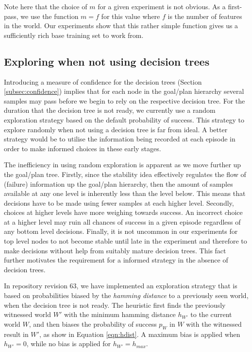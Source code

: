 \documentclass[a4paper]{article}
\newcommand{\dt}{{decision tree}\xspace}
\begin{document}
Note here that the choice of $m$ for a given experiment is not obvious. As a first-pass, we use the function $m=f$ for this value where $f$ is the number of features in the world. Our experiments show that this rather simple function gives us a sufficiently rich base training set to work from. 

\subsection{Exploring when not using {\dt}s}

Introducing a measure of confidence for the {\dt}s (Section \ref{subsec:confidence}) implies that for each node in the goal/plan hierarchy several samples may pass before we begin to rely on the respective \dt. For the duration that the \dt is not ready, we currently use a random exploration strategy based on the default probability of success. This strategy to explore randomly when not using a \dt is far from ideal. A better strategy would be to utilise the information being recorded at each episode in order to make informed choices in these early stages. 

The inefficiency in using random exploration is apparent as we move further up the goal/plan tree. Firstly, since the stability idea effectively regulates the flow of (failure) information up the goal/plan hierarchy, then the amount of samples available at any one level is inherently less than the level below. This means that decisions have to be made using fewer samples at each higher level. Secondly, choices at higher levels have more weighing towards success. An incorrect choice at a higher level may ruin all chances of success in a given episode regardless of any bottom level decisions. Finally, it is not uncommon in our experiments for top level nodes to not become stable until late in the experiment and therefore to make decisions without help from suitably mature {\dt}s. This fact further motivates the requirement for a informed strategy in the absence of {\dt}s.

In repository revision 63, we have implemented an exploration strategy that is based on probabilities biased by the \textit{hamming distance} to a previously seen world, when the decision tree is not ready. The heuristic first finds the previously witnessed world $W'$ with the minimum hamming distance $h_{W'}$ to the current world $W$, and then biases the probability of success $p_W$ in $W$ with the witnessed result in $W'$, as show in Equation \ref{eqn:hdist}. A maximum bias is applied when $h_{W'}=0$, while no bias is applied for  $h_{W'}=h_{max}$.
\end{document}
